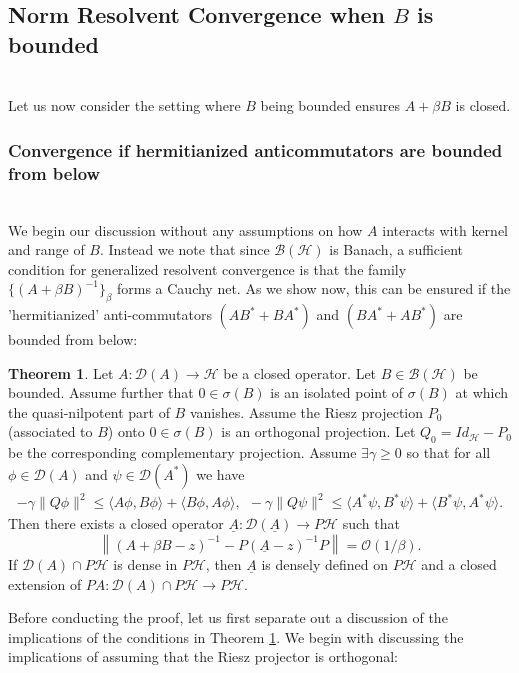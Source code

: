 \documentclass[reqno,12pt,letterpaper]{amsart}
\numberwithin{equation}{section}
\newcommand{\1}{\mathds{1}}
\theoremstyle{definition}
\newtheorem{Thm}[Th]{Theorem}
\begin{document}
\subsection{Norm Resolvent Convergence when $B$ is bounded}\ \\

Let us now consider the setting where  $B$ being bounded ensures  $A + \beta B$ is closed.
\subsubsection{Convergence if hermitianized anticommutators are bounded from below}\ \\
We begin our discussion without any assumptions on how 
$A$ interacts with kernel and range of $B$. Instead we note that since $\mathcal{B}(\mathcal{H})$ is Banach, a sufficient condition for generalized resolvent convergence is that the family $\{(A + \beta B)^{-1}\}_\beta$ forms a Cauchy net. As we show now, this can be ensured if the 'hermitianized' anti-commutators $(AB^* + BA^*)$ and $(BA^* + AB^*)$ are bounded from below:

\begin{Thm}\label{main_closed_theorem}
	Let \( A: \mathcal{D}(A) \rightarrow \mathcal{H} \) be a closed operator. Let \( B \in \mathcal{B}(\mathcal{H}) \) be bounded. Assume further that $0\in \sigma(B)$ is an isolated point of $\sigma(B)$ at which the quasi-nilpotent part of $B$ vanishes. Assume the Riesz projection $P_0$  (associated to $B$) onto $0\in \sigma(B)$ is an orthogonal projection.  Let $Q_0 = Id_{\mathcal{H}} - P_0$ be the corresponding complementary projection. Assume  $\exists \gamma \geq 0$ so that for all $ \phi \in \mathcal{D}(A)$ and $\psi \in \mathcal{D}(A^*)$ we have
	\begin{align}\label{forms_bounded+from_below}
		-\gamma \|Q\phi\|^2 \leq \langle A\phi, B\phi \rangle + \langle B\phi, A\phi \rangle,  \ \
		-\gamma \|Q\psi\|^2 \leq \langle A^*\psi, B^*\psi \rangle + \langle B^*\psi, A^*\psi \rangle.
	\end{align}
	Then there exists a closed  operator \( \underline{A} : \mathcal{D}(\underline{A}) \to P\mathcal{H} \) such that
	\[
	\left\|(A + \beta B - z)^{-1} - P (\underline{A} - z)^{-1} P \right\| = \mathcal{O}\left(1/\beta \right).
	\]
	If $\mathcal{D}(A) \cap P \mathcal{H}$ is dense in
	$P\mathcal{H}$, then $\underline{A}$ is densely defined on $P\mathcal{H}$ and a closed extension of $PA: \mathcal{D}(A)\cap P\mathcal{H} \rightarrow P \mathcal{H} $.
\end{Thm}
Before conducting the proof, let us first separate out a discussion of the implications of the conditions in Theorem \ref{main_closed_theorem}. We begin with discussing the implications of assuming that the Riesz projector is orthogonal:
\end{document}
